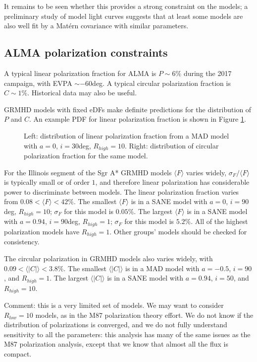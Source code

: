 \documentclass[twocolumn,tighten]{aastex63}
\newcommand\<{{\langle}}
\renewcommand\>{{\rangle}} %
\begin{document}
It remains to be seen whether this provides a strong constraint on the models; a preliminary study of model light curves suggests that at least some models are also well fit by a Mat\'ern covariance with similar parameters.

\subsection{ALMA polarization constraints}

A typical linear polarization fraction for ALMA is $P \sim 6\%$ during the 2017 campaign, with EVPA $\sim -60$deg.  A typical circular polarization fraction is $C \sim 1\%$.  Historical data may also be useful.

GRMHD models with fixed eDFs make definite predictions for the distribution of $P$ and $C$.  An example PDF for linear polarization fraction is shown in Figure \ref{fig:lpexamp}.

\begin{figure}
    \centering
    \caption{Left: distribution of linear polarization fraction from a MAD model with $a = 0$, $i = 30$deg, $R_{high} = 10$. Right: distribution of circular polarization fraction for the same model.}
    \label{fig:lpexamp}
\end{figure}

For the Illinois segment of the Sgr A* GRMHD models $\< F\>$ varies widely, $\sigma_F/\<F\>$ is typically small or of order $1$, and therefore linear polarization has considerable power to discriminate between models.  The linear polarization fraction varies from $0.08 < \<F\> < 42 \%$.  The smallest $\<F\>$ is in a SANE model with $a = 0$, $i = 90$deg, $R_{high} = 10$; $\sigma_F$ for this model is $0.05\%$. The largest $\<F\>$ is in a SANE model with $a = 0.94$, $i = 90$deg, $R_{high} = 1$; $\sigma_F$ for this model is $5.2\%$.  All of the highest polarization models have $R_{high} = 1$.  Other groups' models should be checked for consistency.

The circular polarization in GRMHD models also varies widely, with  $0.09 < \<|C|\> < 3.8 \%$.  The smallest $\<|C|\>$ is in a MAD model with $a = -0.5$, $i = 90$, and $R_{high} = 1$.  The largest $\<|C|\>$ is in a SANE model with $a = 0.94$, $i = 50$, and $R_{high} = 10$.

Comment: this is a very limited set of models.  We may want to consider $R_{low} = 10$ models, as in the M87 polarization theory effort.   We do not know if the distribution of polarizations is converged, and we do not fully understand sensitivity to all the parameters: this analysis has many of the same issues as the M87 polarization analysis, except that we know that almost all the flux is compact.
\end{document}
